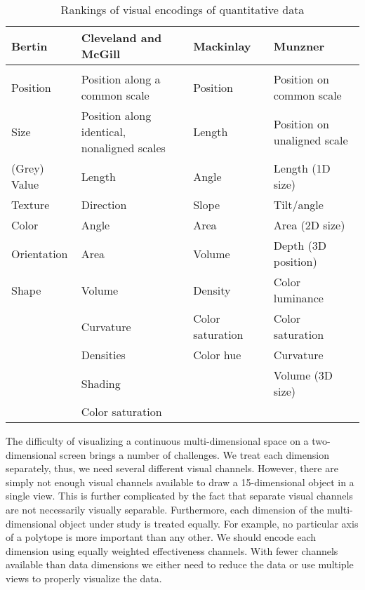 \begin{table}
  \caption{Rankings of visual encodings of quantitative data}
  \label{tbl:visual_encodings}
  \begin{adjustbox}{max width=\linewidth}
  \begin{tabular}{llll}
    Bertin~\cite{Bertin:1967} & Cleveland and McGill~\cite{Cleveland:1984} & Mackinlay~\cite{Mackinlay:1986} & Munzner~\cite{Munzner:2014} \\
    \hline \\
     Position & Position along a common scale & Position & Position on common scale \\
     Size & Position along identical, nonaligned scales & Length & Position on unaligned scale \\
     (Grey) Value & Length & Angle & Length (1D size) \\
     Texture & Direction & Slope & Tilt/angle \\
     Color & Angle & Area & Area (2D size) \\
     Orientation & Area & Volume & Depth (3D position) \\
     Shape & Volume & Density & Color luminance\\
     & Curvature & Color saturation & Color saturation \\
     & Densities & Color hue & Curvature \\
     & Shading & & Volume (3D size) \\
     & Color saturation &           & 
  \end{tabular}
  \end{adjustbox}
\end{table}

The difficulty of visualizing a continuous multi-dimensional space on a
two-dimensional screen brings a number of challenges. We treat each dimension
separately, thus, we need several different visual channels. However, there are
simply not enough visual channels available to draw a 15-dimensional object in
a single view. This is further complicated by the fact that separate visual
channels are not necessarily visually separable.  Furthermore, each dimension
of the multi-dimensional object under study is treated equally. For example, no
particular axis of a polytope is more important than any other.  We should
encode each dimension using equally weighted effectiveness channels.  With
fewer channels available than data dimensions we either need to reduce the data
or use multiple views to properly visualize the data.


